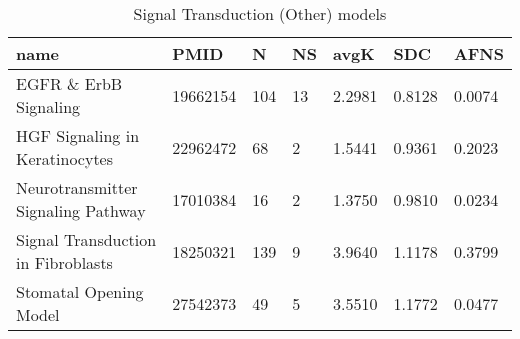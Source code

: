 \begin{table}
\caption{Signal Transduction (Other) models}
\label{tab:Signal_Transduction_(Other)}
\begin{tabular}{|p{180pt}||p{40pt}|p{25pt}|p{25pt}|p{40pt}|p{25pt}|p{25pt}|}
\toprule
name & PMID & N & NS & avgK & SDC & AFNS \\
\midrule
EGFR \& ErbB Signaling & 19662154 & 104 & 13 & 2.2981 & 0.8128 & 0.0074 \\
HGF Signaling in Keratinocytes & 22962472 & 68 & 2 & 1.5441 & 0.9361 & 0.2023 \\
Neurotransmitter Signaling Pathway & 17010384 & 16 & 2 & 1.3750 & 0.9810 & 0.0234 \\
Signal Transduction in Fibroblasts & 18250321 & 139 & 9 & 3.9640 & 1.1178 & 0.3799 \\
Stomatal Opening Model & 27542373 & 49 & 5 & 3.5510 & 1.1772 & 0.0477 \\
\bottomrule
\end{tabular}
\end{table}
